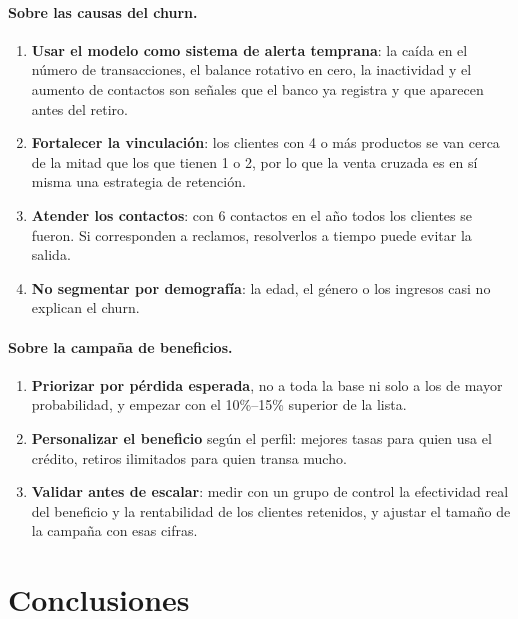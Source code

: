 \documentclass[11pt,a4paper]{article}
\begin{document}
\paragraph{Sobre las causas del churn.}
\begin{enumerate}
  \item \textbf{Usar el modelo como sistema de alerta temprana}: la caída en el número de transacciones, el balance rotativo en cero, la inactividad y el aumento de contactos son señales que el banco ya registra y que aparecen antes del retiro.
  \item \textbf{Fortalecer la vinculación}: los clientes con 4 o más productos se van cerca de la mitad que los que tienen 1 o 2, por lo que la venta cruzada es en sí misma una estrategia de retención.
  \item \textbf{Atender los contactos}: con 6 contactos en el año todos los clientes se fueron. Si corresponden a reclamos, resolverlos a tiempo puede evitar la salida.
  \item \textbf{No segmentar por demografía}: la edad, el género o los ingresos casi no explican el churn.
\end{enumerate}

\paragraph{Sobre la campaña de beneficios.}
\begin{enumerate}[resume]
  \item \textbf{Priorizar por pérdida esperada}, no a toda la base ni solo a los de mayor probabilidad, y empezar con el 10\%--15\% superior de la lista.
  \item \textbf{Personalizar el beneficio} según el perfil: mejores tasas para quien usa el crédito, retiros ilimitados para quien transa mucho.
  \item \textbf{Validar antes de escalar}: medir con un grupo de control la efectividad real del beneficio y la rentabilidad de los clientes retenidos, y ajustar el tamaño de la campaña con esas cifras.
\end{enumerate}

\section{Conclusiones}
\end{document}
